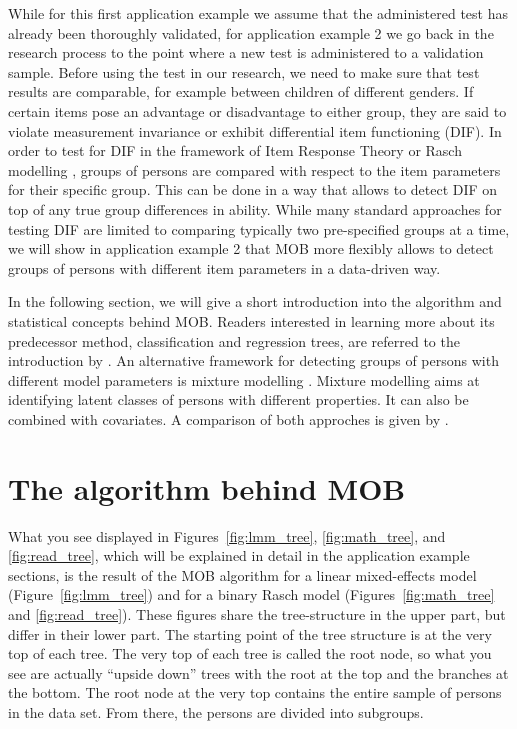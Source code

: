\documentclass[doc,floatsintext,natbib]{apa7}
\begin{document}
While for this first application example we assume that the administered test  has already been thoroughly validated, for application example 2 we go back in the research process to the point where a new test is administered to a validation sample. Before using the test in our research, we need to make sure that test results are comparable, for example between children of different genders. If certain items pose an advantage or disadvantage to either group, they are said to violate measurement invariance or exhibit differential item functioning (DIF). In order to test for DIF in the framework of Item Response Theory or Rasch modelling \cite{AnthyDiPe16,DebStrZei:2022:CRC,Mall97}, groups of persons are compared with respect to the item parameters for their specific group. This can be done in a way that allows to detect DIF on top of any true group differences in ability. While many standard approaches for testing DIF are limited to comparing typically two pre-specified groups at a time, we will show in application example 2 that MOB more flexibly allows to detect groups of persons with different item parameters in a data-driven 
way. 

In the following section, we will give a short introduction into the algorithm and statistical concepts behind MOB. Readers interested in learning more about its predecessor method, classification and regression trees, are referred to the introduction by \citet{StrMalTut:2009:PM}. An alternative framework for detecting groups of persons with different model parameters is mixture modelling \citep[see, e.g.,][in the context of Rasch modelling]{AyalySant17,FriStrZei:2015:EaPM}. Mixture modelling aims at identifying latent classes of persons with different properties. It can also be combined with covariates. A comparison of both approches is given by \citet{FriStrZei:2014}.


\section{The algorithm behind MOB}

What you see displayed in Figures~\ref{fig:lmm_tree}, \ref{fig:math_tree}, and \ref{fig:read_tree}, which will be explained in detail in the application example sections, is the result of the MOB algorithm for a linear mixed-effects model (Figure~\ref{fig:lmm_tree}) and for a binary Rasch model (Figures~\ref{fig:math_tree} and \ref{fig:read_tree}). These figures share the tree-structure in the upper part, but differ in their lower part. The starting point of the tree structure is at the very top of each tree. The very top of each tree is called the root node, so what you see are actually ``upside down'' trees with the root at the top and the branches at the 
bottom. The root node at the very top contains the entire sample of persons in the data set. From there, the persons are divided into subgroups.
\end{document}
